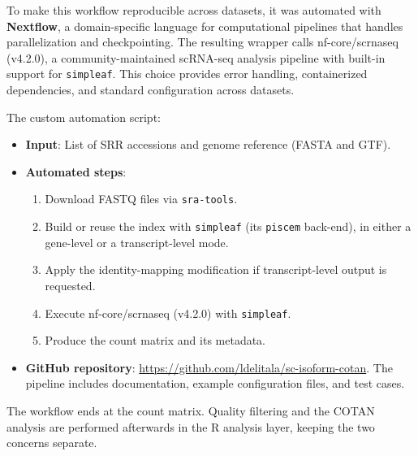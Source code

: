 To make this workflow reproducible across datasets, it was automated with \textbf{Nextflow}\cite{ditommaso2017nextflow}, a domain-specific language for computational pipelines that handles parallelization and checkpointing. The resulting wrapper calls nf-core/scrnaseq (v4.2.0), a community-maintained scRNA-seq analysis pipeline with built-in support for \texttt{simpleaf}. This choice provides error handling, containerized dependencies, and standard configuration across datasets.

The custom automation script:

\begin{itemize}
    \item \textbf{Input}: List of SRR accessions and genome reference (FASTA and GTF).
    \item \textbf{Automated steps}:
    \begin{enumerate}
        \item Download FASTQ files via \texttt{sra-tools}\cite{leinonen2011sra}.
        \item Build or reuse the index with \texttt{simpleaf} (its \texttt{piscem} back-end), in either a gene-level or a transcript-level mode.
        \item Apply the identity-mapping modification if transcript-level output is requested.
        \item Execute nf-core/scrnaseq (v4.2.0) with \texttt{simpleaf}.
        \item Produce the count matrix and its metadata.
    \end{enumerate}

    \item \textbf{GitHub repository}: \url{https://github.com/ldelitala/sc-isoform-cotan}. The pipeline includes documentation, example configuration files, and test cases.
\end{itemize}

The workflow ends at the count matrix. Quality filtering and the COTAN analysis are performed afterwards in the R analysis layer, keeping the two concerns separate.

